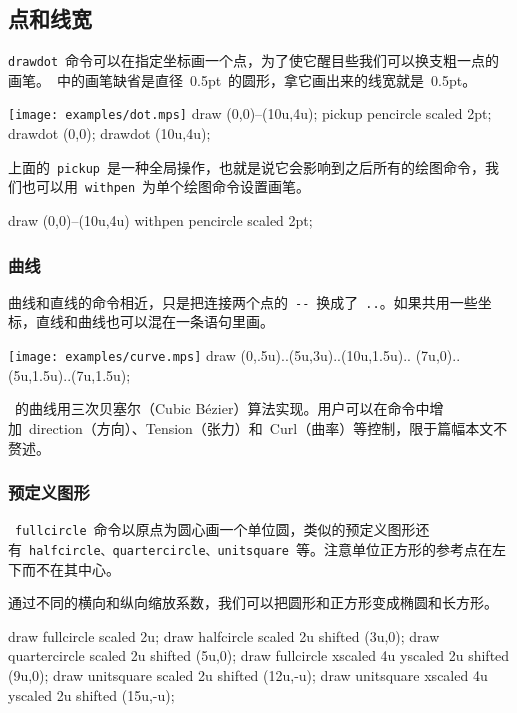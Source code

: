\subsection{点和线宽}
\verb|drawdot|~命令可以在指定坐标画一个点，为了使它醒目些我们可以换支粗一点的画笔。\MP~中的画笔缺省是直径~0.5pt~的圆形，拿它画出来的线宽就是~0.5pt。

\begin{fdemo}{\texttt{[image: examples/dot.mps]}}
draw (0,0)--(10u,4u);
pickup pencircle scaled 2pt;
drawdot (0,0);
drawdot (10u,4u);
\end{fdemo}

上面的~\verb|pickup|~是一种全局操作，也就是说它会影响到之后所有的绘图命令，我们也可以用~\verb|withpen|~为单个绘图命令设置画笔。

\begin{code}
draw (0,0)--(10u,4u) withpen pencircle scaled 2pt;
\end{code}

\subsubsection{曲线}
曲线和直线的命令相近，只是把连接两个点的~\verb|--|~换成了~\verb|..|。如果共用一些坐标，直线和曲线也可以混在一条语句里画。

\begin{fdemo}{\texttt{[image: examples/curve.mps]}}
draw (0,.5u)..(5u,3u)..(10u,1.5u)..
    (7u,0)..(5u,1.5u)..(7u,1.5u);
\end{fdemo}

\MP~的曲线用三次贝塞尔（Cubic B\'ezier）算法实现。用户可以在命令中增加~direction（方向）、Tension（张力）和~Curl（曲率）等控制，限于篇幅本文不赘述。

\subsubsection{预定义图形}
~\verb|fullcircle|~命令以原点为圆心画一个单位圆，类似的预定义图形还有~\verb|halfcircle、quartercircle、unitsquare|~等。注意单位正方形的参考点在左下而不在其中心。

通过不同的横向和纵向缩放系数，我们可以把圆形和正方形变成椭圆和长方形。

\begin{code}
draw fullcircle scaled 2u;
draw halfcircle scaled 2u shifted (3u,0);
draw quartercircle scaled 2u shifted (5u,0);
draw fullcircle xscaled 4u yscaled 2u shifted (9u,0);
draw unitsquare scaled 2u shifted (12u,-u);
draw unitsquare xscaled 4u yscaled 2u shifted (15u,-u);
\end{code}

